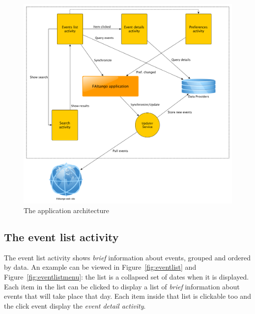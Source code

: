 \documentclass[12pt, twoside]{article}
\begin{document}
\begin{figure}[h]
\begin{center}
\includegraphics[scale=0.39]{fig/app_structure.png}
\end{center}
\caption{The application architecture}
\label{fig:apparc}
\end{figure}


\subsection{The event list activity}

The event list activity shows \emph{brief} information about events, grouped and ordered by data.
An example can be viewed in Figure~\ref{fig:eventlist} and Figure~\ref{fig:eventlistmenu}: the list is a collapsed set of dates when it is displayed. Each item in the list can be clicked to display a list of \emph{brief} information about events that will take place that day. Each item inside that list is clickable too and the click event display the \emph{event detail activity}.
\end{document}
